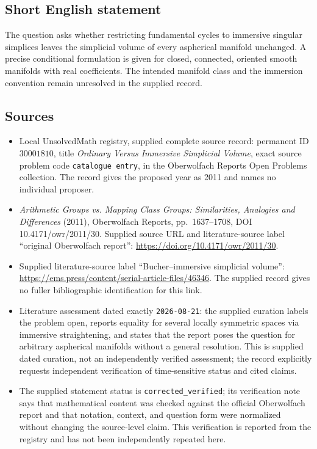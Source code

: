 \documentclass[11pt]{article}
\begin{document}
\subsection{Short English statement}
The question asks whether restricting fundamental cycles to immersive singular simplices leaves the simplicial volume of every aspherical manifold unchanged. A precise conditional formulation is given for closed, connected, oriented smooth manifolds with real coefficients. The intended manifold class and the immersion convention remain unresolved in the supplied record.
\subsection{Sources}
\begin{itemize}
\item Local UnsolvedMath registry, supplied complete source record: permanent ID \(30001810\), title \emph{Ordinary Versus Immersive Simplicial Volume}, exact source problem code \texttt{catalogue entry}, in the Oberwolfach Reports Open Problems collection. The record gives the proposed year as 2011 and names no individual proposer.
\item \emph{Arithmetic Groups vs. Mapping Class Groups: Similarities, Analogies and Differences} (2011), Oberwolfach Reports, pp.\ 1637--1708, DOI 10.4171/owr/2011/30. Supplied source URL and literature-source label ``original Oberwolfach report'': \url{https://doi.org/10.4171/owr/2011/30}.
\item Supplied literature-source label ``Bucher--immersive simplicial volume'': \url{https://ems.press/content/serial-article-files/46346}. The supplied record gives no fuller bibliographic identification for this link.
\item Literature assessment dated exactly \texttt{2026-08-21}: the supplied curation labels the problem open, reports equality for several locally symmetric spaces via immersive straightening, and states that the report poses the question for arbitrary aspherical manifolds without a general resolution. This is supplied dated curation, not an independently verified assessment; the record explicitly requests independent verification of time-sensitive status and cited claims.
\item The supplied statement status is \texttt{corrected\_verified}; its verification note says that mathematical content was checked against the official Oberwolfach report and that notation, context, and question form were normalized without changing the source-level claim. This verification is reported from the registry and has not been independently repeated here.
\end{itemize}
\end{document}
